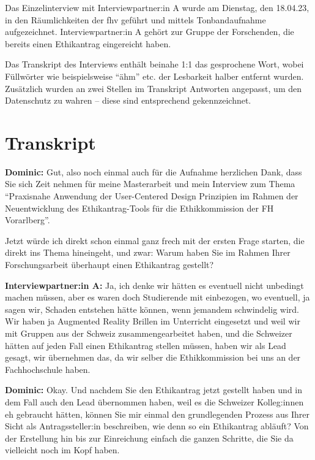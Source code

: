 \documentclass[a4paper,12pt,twoside]{scrreprt}
\begin{document}
Das Einzelinterview mit Interviewpartner:in A wurde am Dienstag, den 18.04.23, in den Räumlichkeiten der \ac{fhv} geführt und mittels Tonbandaufnahme aufgezeichnet. Interviewpartner:in A gehört zur Gruppe der Forschenden, die bereits einen Ethikantrag eingereicht haben.

Das Transkript des Interviews enthält beinahe 1:1 das gesprochene Wort, wobei Füllwörter wie beispielsweise \enquote{ähm} etc. der Lesbarkeit halber entfernt wurden. Zusätzlich wurden an zwei Stellen im Transkript Antworten angepasst, um den Datenschutz zu wahren -- diese sind entsprechend gekennzeichnet.

\section{Transkript}
\label{appendix:interview-1-transkript}

\textbf{Dominic:} Gut, also noch einmal auch für die Aufnahme herzlichen Dank, dass Sie sich Zeit nehmen für meine Masterarbeit und mein Interview zum Thema \enquote{Praxisnahe Anwendung der User-Centered Design Prinzipien im Rahmen der Neuentwicklung des Ethikantrag-Tools für die Ethikkommission der FH Vorarlberg}.

Jetzt würde ich direkt schon einmal ganz frech mit der ersten Frage starten, die direkt ins Thema hineingeht, und zwar: Warum haben Sie im Rahmen Ihrer Forschungsarbeit überhaupt einen Ethikantrag gestellt?

\textbf{Interviewpartner:in A:} Ja, ich denke wir hätten es eventuell nicht unbedingt machen müssen, aber es waren doch Studierende mit einbezogen, wo eventuell, ja sagen wir, Schaden entstehen hätte können, wenn jemandem schwindelig wird. Wir haben ja Augmented Reality Brillen im Unterricht eingesetzt und weil wir mit Gruppen aus der Schweiz zusammengearbeitet haben, und die Schweizer hätten auf jeden Fall einen Ethikantrag stellen müssen, haben wir als Lead gesagt, wir übernehmen das, da wir selber die Ethikkommission bei uns an der Fachhochschule haben.

\textbf{Dominic:} Okay. Und nachdem Sie den Ethikantrag jetzt gestellt haben und in dem Fall auch den Lead übernommen haben, weil es die Schweizer Kolleg:innen eh gebraucht hätten, können Sie mir einmal den grundlegenden Prozess aus Ihrer Sicht als Antragssteller:in beschreiben, wie denn so ein Ethikantrag abläuft? Von der Erstellung hin bis zur Einreichung einfach die ganzen Schritte, die Sie da vielleicht noch im Kopf haben.
\end{document}
